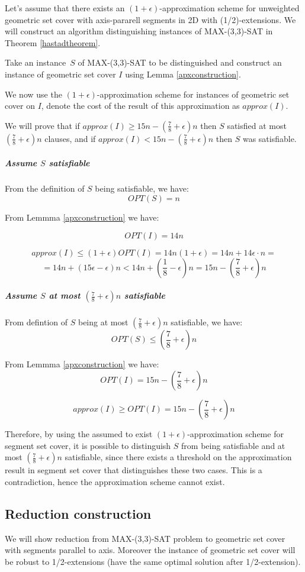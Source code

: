 Let's assume that there exists an $(1+\epsilon)$-approximation scheme
for unweighted geometric set cover with axis-pararell segments in 2D
with (1/2)-extensions.
We will construct an algorithm distinguishing instances of
MAX-(3,3)-SAT
in Theorem \ref{hastadtheorem}.

Take an instance~$S$ of MAX-(3,3)-SAT to be distinguished
and construct an instance of geometric set cover $I$
using Lemma \ref{apxconstruction}.

We now use the $(1+\epsilon)$-approximation scheme
for instances of geometric set cover on $I$,
denote the cost of the result of this approximation as $approx(I)$.

We will prove that 
if $approx(I) \ge 15n - (\frac{7}{8} + \epsilon)n$ then $S$
satisfied at most $(\frac{7}{8}+\epsilon)n$ clauses,
and if $approx(I) < 15n - (\frac{7}{8} + \epsilon)n$ then $S$ was
satisfiable.

\subparagraph{Assume $S$ satisfiable}
From the definition of $S$ being satisfiable, we have:
$$OPT(S) = n$$

From Lemmma \ref{apxconstruction} we have:

$$OPT(I) = 14n$$

$$approx(I) \le (1+\epsilon)OPT(I) = 14n(1+\epsilon)
	= 14n + 14\epsilon\cdot n =$$ 
	$$= 14n + (15\epsilon - \epsilon)n < 
  14n + \left(\frac{1}{8} - \epsilon\right)n 
= 15n - \left(\frac{7}{8} + \epsilon\right)n$$

\subparagraph{Assume $S$ at most
$\left(\frac{7}{8} + \epsilon\right)n$ satisfiable}
From defintion of $S$ being at most 
$\left(\frac{7}{8} + \epsilon\right)n$ satisfiable, we have:
$$OPT(S) \le \left(\frac{7}{8} + \epsilon\right)n$$

From Lemmma \ref{apxconstruction} we have:
$$OPT(I) = 15n - \left(\frac{7}{8} + \epsilon\right)n$$

$$approx(I) \ge OPT(I) = 15n - \left(\frac{7}{8} + \epsilon\right)n$$


Therefore, by using the assumed to exist $(1+\epsilon)$-approximation
scheme for segment set cover,
it is possible to distinguish $S$ from
being satisfiable and at most $(\frac{7}{8} + \epsilon)n$ satisfiable,
since there exists a threshold on the
approximation result in segment set cover that distinguishes
these two cases.
This is a contradiction, hence the approximation scheme cannot exist.

\subsection{Reduction construction}
We will show reduction from MAX-(3,3)-SAT problem
to geometric set cover with segments
parallel to axis. Moreover the instance
of geometric set cover will be robust
to 1/2-extensions (have the same optimal solution
after 1/2-extension).

